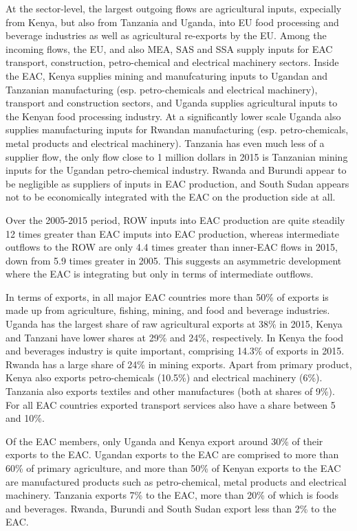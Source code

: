 \documentclass[a4paper]{article}
\begin{document}
At the sector-level, the largest outgoing flows are agricultural inputs, expecially from Kenya, but also from Tanzania and Uganda, into EU food processing and beverage industries as well as agricultural re-exports by the EU. Among the incoming flows, the EU, and also MEA, SAS and SSA supply inputs for EAC transport, construction, petro-chemical and electrical machinery sectors. Inside the EAC, Kenya supplies mining and manufcaturing inputs to Ugandan and Tanzanian manufacturing (esp. petro-chemicals and electrical machinery), transport and construction sectors, and Uganda supplies agricultural inputs to the Kenyan food processing industry.  At a significantly lower scale Uganda also supplies manufacturing inputs for Rwandan manufacturing (esp. petro-chemicals, metal products and electrical machinery). Tanzania has even much less of a supplier flow, the only flow close to 1 million dollars in 2015 is Tanzanian mining inputs for the Ugandan petro-chemical industry. Rwanda and Burundi appear to be negligible as suppliers of inputs in EAC production, and South Sudan appears not to be economically integrated with the EAC on the production side at all. \newline

Over the 2005-2015 period, ROW inputs into EAC production are quite steadily 12 times greater than EAC imputs into EAC production, whereas intermediate outflows to the ROW are only 4.4 times greater  than inner-EAC flows in 2015, down from 5.9 times greater in 2005. This suggests an asymmetric development where the EAC is integrating but only in terms of intermediate outflows. \newline

In terms of exports, in all major EAC countries more than 50\% of exports is made up from agriculture, fishing, mining, and food and beverage industries. Uganda has the largest share of raw agricultural exports at 38\% in 2015, Kenya and Tanzani have lower shares at 29\% and 24\%, respectively. In Kenya the food and beverages industry is quite important, comprising 14.3\% of exports in 2015. Rwanda has a large share of 24\% in mining exports. Apart from primary product, Kenya also exports petro-chemicals (10.5\%) and electrical machinery (6\%). Tanzania also exports textiles and other manufactures (both at shares of 9\%). For all EAC countries exported transport services also have a share between 5 and 10\%. \newline

Of the EAC members, only Uganda and Kenya export around 30\% of their exports to the EAC. Ugandan exports to the EAC are comprised to more than 60\% of primary agriculture, and more than 50\% of Kenyan exports to the EAC are manufactured products such as petro-chemical, metal products and electrical machinery. Tanzania exports 7\% to the EAC, more than 20\% of which is foods and beverages. Rwanda, Burundi and South Sudan export less than 2\% to the EAC.  \newline 
\end{document}
